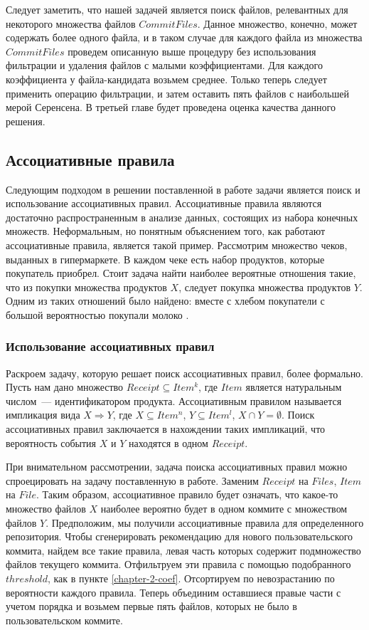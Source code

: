 Следует заметить, что нашей задачей является поиск файлов, релевантных для некоторого множества файлов $CommitFiles$. Данное множество, конечно, может содержать более одного файла, и в таком случае для каждого файла из множества $CommitFiles$ проведем описанную выше процедуру без использования фильтрации и удаления файлов с малыми коэффициентами. Для каждого коэффициента у файла-кандидата возьмем среднее. Только теперь следует применить операцию фильтрации, и затем оставить пять файлов с наибольшей мерой Серенсена. В третьей главе будет проведена оценка качества данного решения.
    \subsection{Ассоциативные правила}\label{chapter2-rules}
Следующим подходом в решении поставленной в работе задачи является поиск и использование ассоциативных правил. Ассоциативные правила являются достаточно распространенным в анализе данных, состоящих из набора конечных множеств. Неформальным, но понятным объяснением того, как работают ассоциативные правила, является такой пример. Рассмотрим множество чеков, выданных в гипермаркете. В каждом чеке есть набор продуктов, которые покупатель приобрел. Стоит задача найти наиболее вероятные отношения такие, что из покупки множества продуктов $X$, следует покупка множества продуктов $Y$. Одним из таких отношений было найдено: вместе с хлебом покупатели с большой вероятностью покупали молоко \cite{as-rules}.
    \subsubsection{Использование ассоциативных правил}
Раскроем задачу, которую решает поиск ассоциативных правил, более формально. Пусть нам дано множество $Receipt \subseteq Item^k$, где $Item$ является натуральным числом~--- идентификатором продукта. Ассоциативным правилом называется импликация вида $X \Rightarrow Y$, где $X \subseteq Item^n$, $Y \subseteq Item^l$, $X \cap Y = \emptyset$. Поиск ассоциативных правил заключается в нахождении таких импликаций, что вероятность события $X$ и $Y$ находятся в одном $Receipt$. 

При внимательном рассмотрении, задача поиска ассоциативных правил можно спроецировать на задачу поставленную в работе. Заменим $Receipt$ на $Files$, $Item$ на $File$. Таким образом, ассоциативное правило будет означать, что какое-то множество файлов $X$ наиболее вероятно будет в одном коммите с множеством файлов $Y$. Предположим, мы получили ассоциативные правила для определенного репозитория. Чтобы сгенерировать рекомендацию для нового пользовательского коммита, найдем все такие правила, левая часть которых содержит подмножество файлов текущего коммита. Отфильтруем эти правила с помощью подобранного $threshold$, как в пункте \ref{chapter-2-coef}. Отсортируем по невозрастанию по вероятности каждого правила. Теперь объединим оставшиеся правые части с учетом порядка и возьмем первые пять файлов, которых не было в пользовательском коммите.
